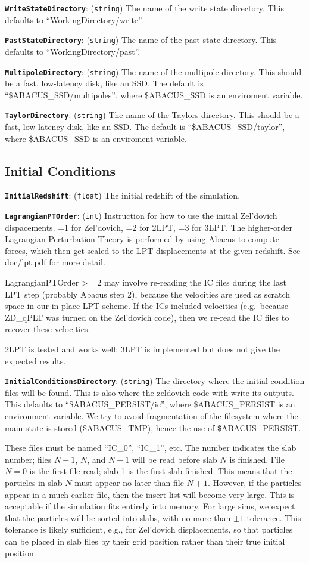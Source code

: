 \documentclass[11pt,preprint]{aastex}
\newcommand{\param}[2]{\medskip\noindent\textbf{\texttt{#1}}: ({\tt #2}) }
\begin{document}
\param{WriteStateDirectory}{string} The name of the write state directory.
This defaults to ``WorkingDirectory/write''.

\param{PastStateDirectory}{string} The name of the past state directory.
This defaults to ``WorkingDirectory/past''.

\param{MultipoleDirectory}{string} The name of the multipole directory.
This should be a fast, low-latency disk, like an SSD.  The default is
``\$ABACUS\_SSD/multipoles'', where \$ABACUS\_SSD is an enviroment variable.

\param{TaylorDirectory}{string} The name of the Taylors directory.
This should be a fast, low-latency disk, like an SSD.  The default is
``\$ABACUS\_SSD/taylor'', where \$ABACUS\_SSD is an enviroment variable.

\subsection{Initial Conditions}

\param{InitialRedshift}{float} The initial redshift of the simulation.

\param{LagrangianPTOrder}{int} Instruction for how to use the initial 
Zel'dovich dispacements.  =1 for Zel'dovich, =2 for 2LPT, =3 for 3LPT.
The higher-order Lagrangian Perturbation Theory is performed by using
Abacus to compute forces, which then get scaled to the LPT displacements
at the given redshift.  See doc/lpt.pdf for more detail.

LagrangianPTOrder >= 2 may involve re-reading the IC files during the last LPT step (probably Abacus step 2),
because the velocities are used as scratch space in our in-place LPT scheme.  If the ICs included velocities
(e.g.~because ZD\_qPLT was turned on the Zel'dovich code), then we re-read the IC files to recover these velocities.

2LPT is tested and works well; 3LPT is implemented but does not give the expected results.

\param{InitialConditionsDirectory}{string} The directory where the 
initial condition files will be found.  This is also where the zeldovich
code with write its outputs.
This defaults to ``\$ABACUS\_PERSIST/ic'', where \$ABACUS\_PERSIST is an
environment variable. We try to avoid fragmentation of the filesystem
where the main state is stored (\$ABACUS\_TMP), hence the use of \$ABACUS\_PERSIST.

These files must be named ``IC\_0'', ``IC\_1'', etc.  The number
indicates the slab number; files $N-1$, $N$, and $N+1$ will be read
before slab $N$ is finished. File $N=0$ is the first file read;
slab 1 is the first slab finished.  This means that the particles
in slab $N$ must appear no later than file $N+1$.  However, if the
particles appear in a much earlier file, then the insert list will
become very large.  This is acceptable if the simulation fits entirely
into memory.  For large sims, we expect that the particles will be 
sorted into slabs, with no more than $\pm 1$ tolerance.  This tolerance
is likely sufficient, e.g., for Zel'dovich displacements, so that particles
can be placed in slab files by their grid position rather than their
true initial position.
\end{document}
